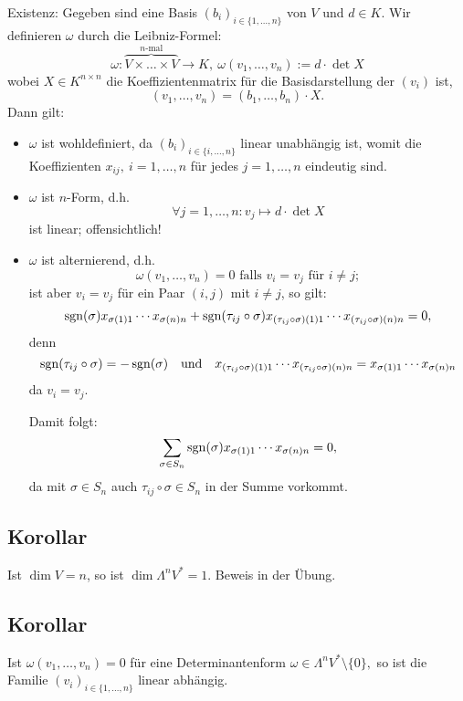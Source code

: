  		Existenz: Gegeben sind eine Basis $ (b_i)_{i\in \{1,\dots, n\}} $ von $ V $ und $ d\in K $. Wir definieren $ \omega $ durch die Leibniz-Formel:
 		\[
 			\omega: \overbrace{V\times \dots \times V}^{n\text{-mal}} \to K,\ \omega(v_1,\dots,v_n):=d\cdot\det X
 		\]
 		wobei $ X\in K^{n\times n} $ die Koeffizientenmatrix für die Basisdarstellung der $ (v_i) $ ist,
 		\[
 			(v_1,\dots,v_n)=(b_1,\dots,b_n)\cdot X.
 		\]
 		Dann gilt:
 		\begin{itemize}
 			\item $ \omega $ ist wohldefiniert, da $ (b_i)_{i\in \{i,\dots,n\}} $ linear unabhängig ist, womit die Koeffizienten $ x_{ij},\ i=1,\dots,n $ für jedes $ j=1,\dots,n $ eindeutig sind.
 			\item $ \omega $ ist $ n $-Form, d.h.
 			      \[
 			      	\forall j=1,\dots,n: v_j\mapsto d\cdot\det X
 			      \]
 			      ist linear; offensichtlich!
 			\item $ \omega $ ist alternierend, d.h.
 			      \[
 			      	\omega(v_1,\dots,v_n)=0\text{ falls } v_i = v_j \text{ für }i\neq j;
 			      \]
 			      ist aber $ v_i = v_j $ für ein Paar $ (i,j) $ mit $ i\neq j $, so gilt:
 			      \[
 			      	\operatorname{sgn}(\sigma)x_{\sigma(1)1}\cdots x_{\sigma(n)n} + \operatorname{sgn}(\tau_{ij}\circ \sigma) x_{(\tau_{ij}\circ \sigma)(1)1}\cdots x_{(\tau_{ij}\circ \sigma)(n)n} = 0,
 			      \]
 			      denn
 			      \[
 			      	\operatorname{sgn}(\tau_{ij}\circ \sigma) = -\operatorname{sgn}(\sigma) \quad\text{und}\quad x_{(\tau_{ij}\circ\sigma)(1)1}\cdots x_{(\tau_{ij}\circ\sigma)(n)n} = x_{\sigma(1)1}\cdots x_{\sigma(n)n}
 			      \]
 			      da $ v_i = v_j $.

 			      Damit folgt:
 			      \[
 			      	\sum_{\sigma\in S_n}\operatorname{sgn}(\sigma)x_{\sigma(1)1}\cdots x_{\sigma(n)n}=0,
 			      \]
 			      da mit $ \sigma\in S_n $ auch $ \tau_{ij}\circ\sigma\in S_n $ in der Summe vorkommt.
 		\end{itemize}
 \subsection{Korollar}
 	\begin{Korollar}
 		Ist $ \dim V = n $, so ist $ \dim\Lambda^nV^* = 1 $. Beweis in der Übung.
 	\end{Korollar}
 \subsection{Korollar}
 	Ist $ \omega(v_1,\dots,v_n)=0 $ für eine Determinantenform $ \omega\in\Lambda^nV^*\setminus\{0\}, $ so ist die Familie $ (v_i)_{i\in \{1,\dots, n\}} $ linear abhängig.
